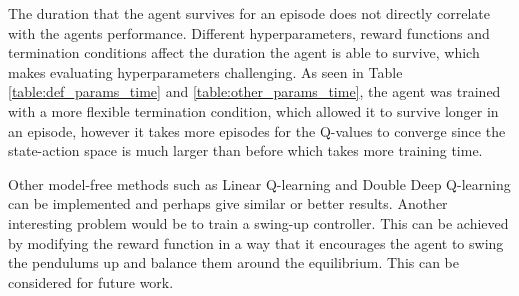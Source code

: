 \documentclass[final]{LTHtwocol} %
\begin{document}
The duration that the agent survives for an episode does not directly correlate with the agents performance.
Different hyperparameters, reward functions and termination conditions affect the duration the agent is able to survive, which makes evaluating hyperparameters challenging.
As seen in Table \ref{table:def_params_time} and \ref{table:other_params_time}, the agent was trained with a more flexible termination condition, which allowed it to survive longer in an episode, however it takes more episodes for the Q-values to converge since the state-action space is much larger than before which takes more training time.


Other model-free methods such as Linear Q-learning \cite{Linear_Q_Learning} and Double Deep Q-learning \cite{Deep_Double_Q_Learning} can be implemented and perhaps give similar or better results.
Another interesting problem would be to train a swing-up controller.
This can be achieved by modifying the reward function in a way that it encourages the agent to swing the pendulums up and balance them around the equilibrium.
This can be considered for future work.


\printbibliography
\end{document}
